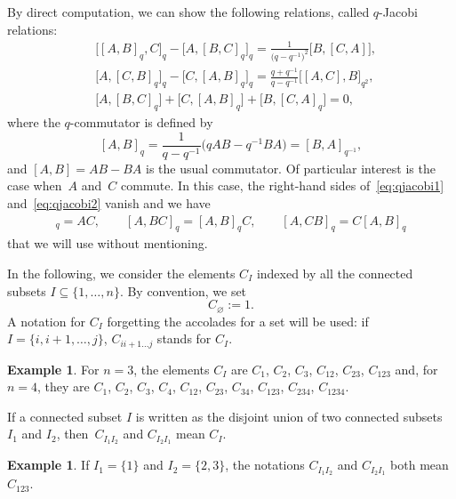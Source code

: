 \documentclass[pdftex]{sigma}
\numberwithin{equation}{section}
\theoremstyle{definition}
\newtheorem{exam}[theo]{Example}
\begin{document}
By direct computation, we can show the following relations, called $q$-Jacobi relations:
\begin{subequations}
\begin{align}
 &\bigl[[A,B]_q,C\bigr]_q-\bigl[A,[B,C]_q\bigr]_q=\frac{1}{\big(q-q^{-1}\big)^2}\bigl[B,[C,A]\bigr] , \label{eq:qjacobi1}\\
 &\bigl[A,[C,B]_q\bigr]_q-\bigl[C,[A,B]_q\bigr]_q=\frac{q+q^{-1}}{q-q^{-1}}\bigl[[A,C],B\bigr]_{q^2} ,\label{eq:qjacobi2}\\
 &\bigl[A,[B,C]_q\bigr]+\bigl[C,[A,B]_q\bigr]+\bigl[B,[C,A]_{q}\bigr]=0 ,\label{eq:qjacobi3}
\end{align}
\end{subequations}
where the $q$-commutator is defined by
\begin{equation} \label{eq:qcom}
 [A,B]_q=\frac{1}{q-q^{-1}}\big(qAB- q^{-1}BA\big)=[B,A]_{q^{-1}} ,
\end{equation}
and $[A,B]=AB-BA$ is the usual commutator.
Of particular interest is the case when~$A$ and~$C$ commute. In this case, the right-hand sides of~\eqref{eq:qjacobi1} and~\eqref{eq:qjacobi2} vanish
and we have
\begin{align*}
[A,C]_q=AC,\qquad [A,BC]_q=[A,B]_qC,\qquad [A,CB]_q=C[A,B]_q
 \end{align*}
that we will use without mentioning.

In the following, we consider the elements $C_I$ indexed by all the connected subsets $I\subseteq\{1,\dots,n\}$.
By convention, we set
\begin{equation}\label{eq:Cvide}
 C_{\varnothing}:=1 .
\end{equation}
A notation for $C_I$ forgetting the accolades for a set will be used: if $I=\{i,i+1,\dots,j\}$, $C_{ii+1\dots j}$ stands for $C_I$.
\begin{exam}
For $n=3$, the elements $C_I$ are $C_1$, $C_2$, $C_3$, $C_{12}$, $C_{23}$, $C_{123}$ and, for $n=4$, they are $C_1$, $C_2$, $C_3$, $C_4$, $C_{12}$, $C_{23}$, $C_{34}$, $C_{123}$, $C_{234}$, $C_{1234}$.
\end{exam}
 If a connected subset $I$ is written as the disjoint union of two connected subsets $I_1$ and $I_2$, then~$C_{I_1I_2}$ and $C_{I_2I_1}$ mean $C_I$.
\begin{exam}
If $I_1=\{1\}$ and $I_2=\{2,3\}$, the notations $C_{I_1I_2}$ and $C_{I_2I_1}$ both mean $C_{123}$.
\end{exam}
\end{document}

